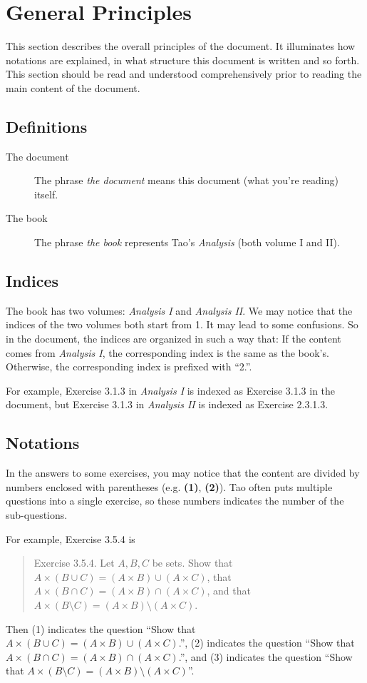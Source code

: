 
\section{General Principles}
This section describes the overall principles of the document. It illuminates how notations are explained, 
in what structure this document is written and so forth. This section should be read and understood 
comprehensively prior to reading the main content of the document.

\subsection{Definitions}
\begin{description}
\item[The document] The phrase \emph{the document} means this document (what you're reading) itself.
\item[The book] The phrase \emph{the book} represents Tao's \emph{Analysis} (both volume I and II).
\end{description}

\subsection{Indices}
The book has two volumes: 
\emph{Analysis I} and \emph{Analysis II}. We may notice that the indices of the two volumes both start 
from 1. It may lead to some confusions. So in the document, the indices are organized in such a way that:
If the content comes from \emph{Analysis I}, the corresponding index is the same as the book's. 
Otherwise, the corresponding index is prefixed with ``2.''.

For example, Exercise 3.1.3 in \emph{Analysis I} is indexed as Exercise 3.1.3 in the document, but 
Exercise 3.1.3 in \emph{Analysis II} is indexed as Exercise 2.3.1.3.

\subsection{Notations}
In the answers to some exercises, you may notice that the content are divided by numbers enclosed with 
parentheses (e.g. \textbf{(1)}, \textbf{(2)}). Tao often puts multiple questions into a single exercise, 
so these numbers indicates the number of the sub-questions.

For example, Exercise 3.5.4 is 
\begin{quotation}
Exercise 3.5.4. Let $A,B,C$ be sets. Show that $A\times(B\cup C) = (A\times B)\cup(A\times C)$,
that $A\times(B\cap C) = (A\times B)\cap(A\times C)$, and that 
$ A\times(B\setminus C) = (A\times B)\setminus(A\times C)$.
\end{quotation}
Then (1) indicates the question ``Show that $A\times(B\cup C) = (A\times B)\cup(A\times C)$.'', 
(2) indicates the question ``Show that $A\times(B\cap C) = (A\times B)\cap(A\times C)$.'', and 
(3) indicates the question ``Show that $A\times(B\setminus C) = (A\times B)\setminus(A\times C)$''.

